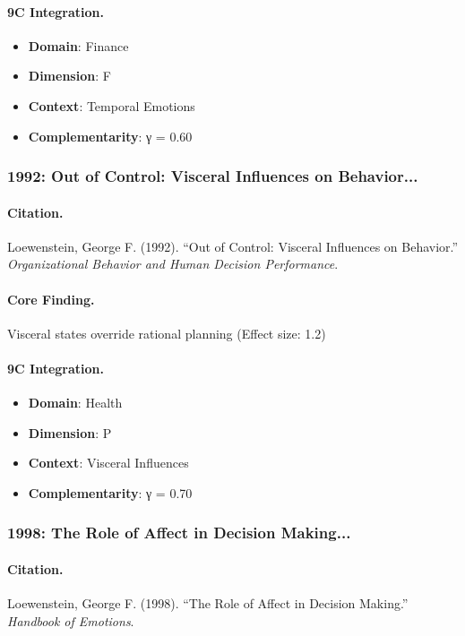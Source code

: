 \paragraph{9C Integration.}
\begin{itemize}[nosep]
  \item \textbf{Domain}: Finance
  \item \textbf{Dimension}: F
  \item \textbf{Context}: Temporal Emotions
  \item \textbf{Complementarity}: γ = 0.60
\end{itemize}

\subsubsection{1992: Out of Control: Visceral Influences on Behavior...}

\paragraph{Citation.}
Loewenstein, George F. (1992). ``Out of Control: Visceral Influences on Behavior.''
\textit{Organizational Behavior and Human Decision Performance}.

\paragraph{Core Finding.}
Visceral states override rational planning (Effect size: 1.2)

\paragraph{9C Integration.}
\begin{itemize}[nosep]
  \item \textbf{Domain}: Health
  \item \textbf{Dimension}: P
  \item \textbf{Context}: Visceral Influences
  \item \textbf{Complementarity}: γ = 0.70
\end{itemize}

\subsubsection{1998: The Role of Affect in Decision Making...}

\paragraph{Citation.}
Loewenstein, George F. (1998). ``The Role of Affect in Decision Making.''
\textit{Handbook of Emotions}.

